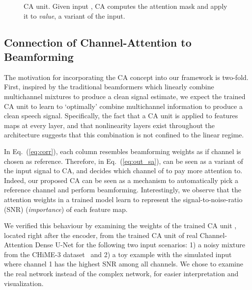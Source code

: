 \documentclass{article}
\begin{document}
\begin{figure}[htb]
\begin{minipage}[b]{1.0\linewidth}
	\end{minipage}
	\vspace*{-6mm}
	\caption{CA unit. Given input , CA computes the attention mask  and apply it to {\it value}, a variant of the input.}
	\label{fig:sa}
	\vspace*{-5mm}
\end{figure}


\subsection{Connection of Channel-Attention to Beamforming}

The motivation for incorporating the CA concept into our framework is two-fold. First, inspired by the traditional beamformers which linearly combine multichannel mixtures to produce a clean signal estimate, we expect the trained CA unit to learn to `optimally' combine multichannel information to produce a clean speech signal. Specifically, the fact that a CA unit is applied to features maps at every layer, and that nonlinearity layers exist throughout the architecture suggests that this combination is not confined to the linear regime.



In Eq.~(\ref{eq:corr}), each column  resembles beamforming weights as if channel  is chosen as reference. Therefore, in Eq.~(\ref{eq:out_sa}),  can be seen as a variant of the input signal to CA, and  decides which channel of  to pay more attention to. Indeed, our proposed CA can be seen as a mechanism to automatically pick a reference channel and perform beamforming. Interestingly, we observe that the attention weights in a trained model learn to represent the signal-to-noise-ratio (SNR) ({\it importance}) of each feature map.



We verified this behaviour by examining the weights of the trained CA unit , located right after the encoder, from the trained CA unit of real Channel-Attention Dense U-Net for the following two input scenarios: 1) a noisy mixture from the CHiME-3 dataset~\cite{chime} and 2) a toy example with the simulated input where channel 1 has the highest SNR among all channels. We chose to examine the real network instead of the complex network, for easier interpretation and visualization.
\end{document}
